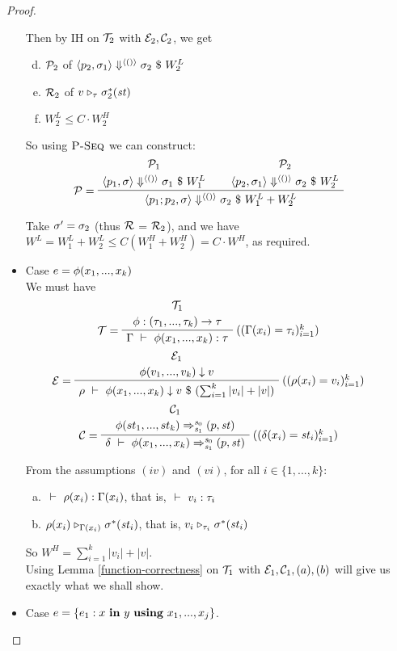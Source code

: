 \begin{proof}
\begin{itemize}
Then by IH on  $\mathcal{T}_2$ with $\mathcal{E}_2,\mathcal{C}_2$, we get 
\begin{enumerate}	[(a)]
	\setcounter{enumi}{3}
	\item $\mathcal{P}_2$ of $\left\langle p_2,\sigma_1 \right\rangle \Downarrow^{\langle () \rangle} \sigma_2 \ \$ \ W^L_2$ 
	\item $\mathcal{R}_2$ of $ v \mathrel{\triangleright_{\tau}} \sigma_2^*(\mathit{st})$
    \item $W^L_2 \le C \cdot W^H_2 $
\end{enumerate}

So using $\textsc{P-Seq}$ we can construct:  
$$\PT{
	\UCN{\MP_1}{\seval{p_1}{\sgm}{\vunit}{\sgm_1}{W^L_1}}
	\UCN{\MP_2}{\seval{p_2}{\sgm_1}{\vunit}{\sgm_2}{W^L_2}}
	\LeLa{\MP = }	
	\BC{\seval{p_1;p_2}{\sgm}{\vunit}{\sgm_2}{W^L_1+W^L_2}}
}$$


Take $\sigma' = \sigma_2$ (thus $\mathcal{R}$ = $\mathcal{R}_2$),  and we have $W^L=W^L_1+W^L_2 \le C(W^H_1+W^H_2) = C \cdot W^H$, as required.



\item Case $e = \phi(x_1,...,x_k)$ \\
We must have  
$$\PT{
	\UCN{\MT_1}{\Typef {\hcall} {\replc{k}{\tau}} {\tau}}
	\LeLa{\MT = }
	\RiLa{((\Gam(x_i)= \tau_i)^k_{i=1})}
	\UC{\Type{\Gam}{\hcall{\Tupk{x}}}{\tau}}
}$$
$$\PT{
	\UCN{\ME_1}{\EvalF{\hcall}{v_1,...,v_k}{v}}
	\LeLa{\ME = }
	\RiLa{((\rho(x_i)=v_i)^k_{i=1})}
	\UC{\Eval{\rho}{\hcall{\Tupk{x}}}{v}{(\sum_{i=1}^{k}|v_i| +|v| )}}
}$$
$$\PT{
	\UCN{\MC_1}{\Transf{\hcall}{\replc{k}{st}}{\s_0}{\s_1}{\sfun{p}{\st}}}
	\LeLa{\MC =}
	\RiLa{((\del(x_i)=\st_i)^k_{i=1})}
	\UC{\Trans{\del}{\hcall \Tupk{x}}{\s_0}{\s_1}{\sfun{p}{\st}}}
}$$

From the assumptions $(iv)$ and $(vi)$, for all $i \in \{1,...,k\}$:
\begin{enumerate}[(a)]
	\item $\ \vdash\  \rho(x_i) : \Gamma(x_i)$, that is, $\ \vdash\  v_i : \tau_i$
	\item $\rho(x_i) \mathrel{\triangleright_{\Gamma(x_i)}} \sigma^*(\mathit{st}_i)$, that is,
	$v_i \mathrel{\triangleright_{\tau_i}} \sigma^*(\mathit{st}_i)$
\end{enumerate}

So $W^H = \sum_{i=1}^{k}|v_i| +|v|$. \\ 
Using Lemma \ref{function-correctness} on $\mathcal{T}_1$  with $\mathcal{E}_1, \mathcal{C}_1, (a),(b)$ will give us exactly what we shall show.

		
		\item Case $e = \{e_1 : x \ \mathbf{in} \ y \ \mathbf{using} \ x_1,...,x_j\}$. \\
\def\eqnum#1{eq-mainproof-#1}  


\end{itemize}
\end{proof}
